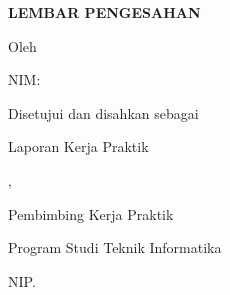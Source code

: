 \begin{titlepage}
\begin{center}
\vspace*{0.2cm}
{\bfseries\Large LEMBAR PENGESAHAN\par}
\vspace{0.4cm}
{\bfseries\large \JudulLaporan\par
\vspace{0.2cm}
\bfseries\large \TempatKP\par}
\vspace{0.6cm}
{Oleh\par
\large \textbf{\NamaMahasiswa}\par
\large NIM: \NIM\par}
\vfill
{Disetujui dan disahkan sebagai\par
Laporan Kerja Praktik\par}
\vfill
{\Kota, \TanggalPengesahan\par}
\vspace{0.4cm}
{Pembimbing Kerja Praktik\par
Program Studi Teknik Informatika\par}
\vspace{1.6cm}
{\underline{\NamaDosenPembimbing}\par
NIP. \NIPDosenPembimbing\par}
\end{center}
\end{titlepage}
